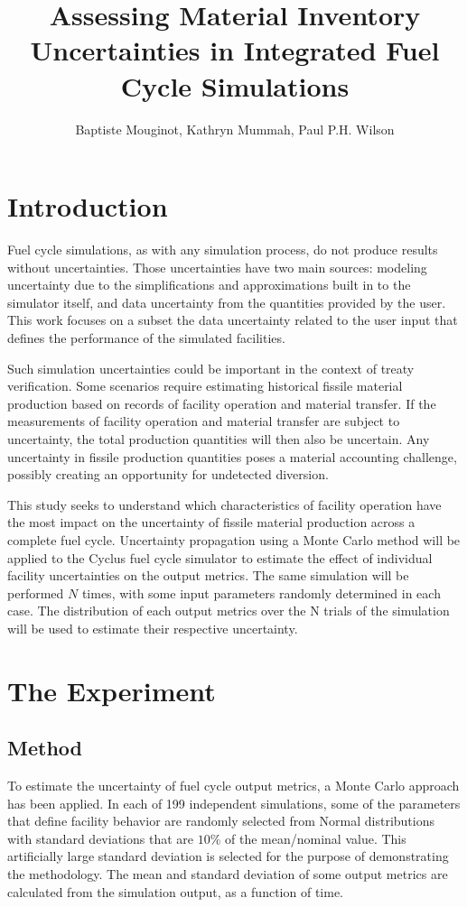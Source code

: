 \documentclass{anstrans}
\title{Assessing Material Inventory Uncertainties in Integrated Fuel Cycle Simulations}
\author{Baptiste Mouginot, Kathryn Mummah, Paul P.H.  Wilson}
\institute{
University of Wisconsin-Madison, Madison, WI
}
\begin{document}
\section{Introduction}

Fuel cycle simulations, as with any simulation process, do not produce results
without uncertainties.  Those uncertainties have two main sources: modeling
uncertainty due to the simplifications and approximations built in to the
simulator itself, and data uncertainty from the quantities provided by the user.
This work focuses on a subset the data uncertainty related to the user input
that defines the performance of the simulated facilities.

Such simulation uncertainties could be important in the context of treaty
verification.  Some scenarios require estimating historical fissile material
production based on records of facility operation and material transfer.  If the
measurements of facility operation and material transfer are subject to
uncertainty, the total production quantities will then also be uncertain.  Any
uncertainty in fissile production quantities poses a material accounting
challenge, possibly creating an opportunity for undetected diversion.

This study seeks to understand which characteristics of facility operation have
the most impact on the uncertainty of fissile material production across a
complete fuel cycle.  Uncertainty propagation using a Monte Carlo method will be
applied to the Cyclus fuel cycle simulator \cite{cyclus} to estimate the effect
of individual facility uncertainties on the output metrics. The same simulation
will be performed $N$ times, with some input parameters randomly determined in
each case.  The distribution of each output metrics over the N trials of the
simulation will be used to estimate their respective uncertainty.

\section{The Experiment}

\subsection{Method}

To estimate the uncertainty of fuel cycle output metrics, a Monte Carlo approach
has been applied.  In each of 199 independent simulations, some of the
parameters that define facility behavior are randomly selected from Normal
distributions with standard deviations that are $10\%$ of the mean/nominal
value.  This artificially large standard deviation is selected for the purpose
of demonstrating the methodology.  The mean and standard deviation of some
output metrics are calculated from the simulation output, as a function of time.
\end{document}
